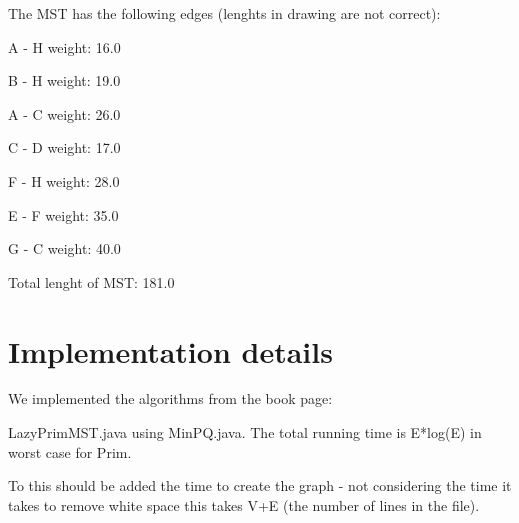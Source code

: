   
  
  The MST has the following edges (lenghts in drawing are not correct):
  
  A - H weight: 16.0
  
  B - H weight: 19.0
  
  A - C weight: 26.0
  
  C - D weight: 17.0
  
  F - H weight: 28.0
  
  E - F weight: 35.0
  
  G - C weight: 40.0
  
  Total lenght of MST: 181.0 
  
  \section{Implementation details}

  We implemented the algorithms from the book page: 
  
  LazyPrimMST.java using MinPQ.java. The total running time is E*log(E) in worst case for Prim.
  
  To this should be added the time to create the graph - not considering the time it takes to remove white space this takes V+E (the number of lines in the file). 
  
  
  
  


